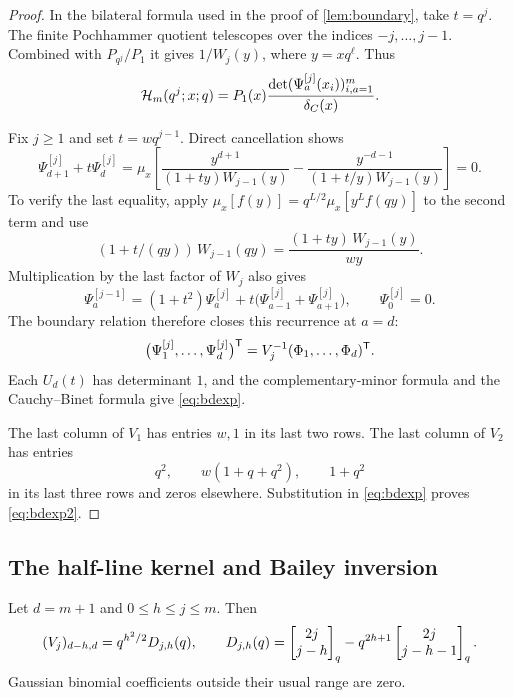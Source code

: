\begin{proof}
In the bilateral formula used in the proof of \cref{lem:boundary}, take $t=q^j$. The finite Pochhammer quotient telescopes over the indices $-j,\dots,j-1$. Combined with $P_{q^j}/P_1$ it gives $1/W_j(y)$, where $y=xq^\ell$. Thus
\[
\mathcal{H}_m(q^j;x;q)=P_1(x)\frac{\det(\Psi^{[j]}_a(x_i))_{i,a=1}^m}{\delta_C(x)}.
\]

Fix $j\ge1$ and set $t=wq^{j-1}$. Direct cancellation shows
\[
\Psi^{[j]}_{d+1}+t\Psi^{[j]}_d=\mu_x\left[\frac{y^{d+1}}{(1+ty)W_{j-1}(y)}-\frac{y^{-d-1}}{(1+t/y)W_{j-1}(y)}\right]=0.
\]
To verify the last equality, apply $\mu_x[f(y)]=q^{L/2}\mu_x[y^Lf(qy)]$ to the second term and use
\[
(1+t/(qy))\,W_{j-1}(qy)=\frac{(1+ty)\,W_{j-1}(y)}{wy}.
\]
Multiplication by the last factor of $W_j$ also gives
\[
\Psi^{[j-1]}_a=(1+t^2)\Psi^{[j]}_a+t\bigl(\Psi^{[j]}_{a-1}+\Psi^{[j]}_{a+1}\bigr),\qquad \Psi^{[j]}_0=0.
\]
The boundary relation therefore closes this recurrence at $a=d$:
\[
\bigl(\Psi^{[j]}_1,\dots,\Psi^{[j]}_d\bigr)^{\mathsf{T}}=V_j^{-1}(\Phi_1,\dots,\Phi_d)^{\mathsf{T}}.
\]
Each $U_d(t)$ has determinant $1$, and the complementary-minor formula and the Cauchy--Binet formula give \eqref{eq:bdexp}.

The last column of $V_1$ has entries $w,1$ in its last two rows. The last column of $V_2$ has entries
\[
q^2,\qquad w(1+q+q^2),\qquad 1+q^2
\]
in its last three rows and zeros elsewhere. Substitution in \eqref{eq:bdexp} proves \eqref{eq:bdexp2}.
\end{proof}

\subsection{The half-line kernel and Bailey inversion}

\begin{proposition}\label{prop:coeffs}
Let $d=m+1$ and $0\le h\le j\le m$. Then
\begin{equation}\label{eq:coeffs}
(V_j)_{d-h,d}=q^{h^2/2}D_{j,h}(q),\qquad D_{j,h}(q)=\begin{bmatrix}2j\\j-h\end{bmatrix}_q-q^{2h+1}\begin{bmatrix}2j\\j-h-1\end{bmatrix}_q.
\end{equation}
Gaussian binomial coefficients outside their usual range are zero.
\end{proposition}

